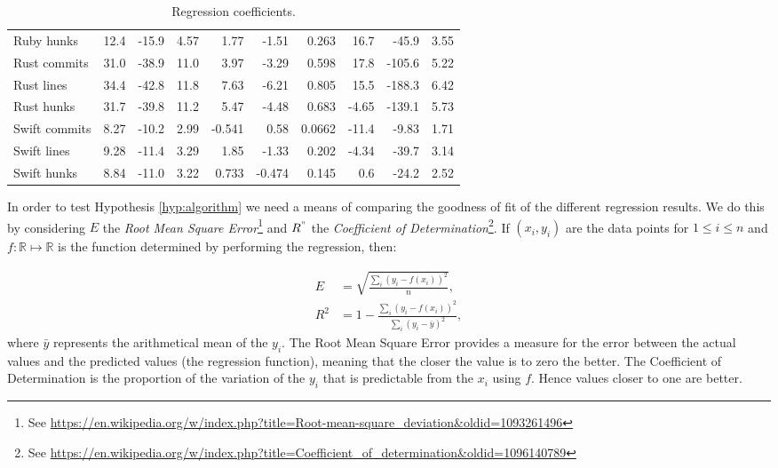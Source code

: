 \documentclass[10pt,journal,compsoc]{IEEEtran}
\begin{document}
\begin{table*}[t!]
\begin{center}
\begin{tabular}{l | *{3}{d{3.4}} | *{3}{d{3.4}} | d{4.5} *{2}{d{3.4}} }
Ruby hunks & 12.4 & -15.9 & 4.57 & 1.77 & -1.51 & 0.263 & 16.7 & -45.9 & 3.55 \\ \hdashline
Rust commits & 31.0 & -38.9 & 11.0 & 3.97 & -3.29 & 0.598 & 17.8 & -105.6 & 5.22 \\
Rust lines & 34.4 & -42.8 & 11.8 & 7.63 & -6.21 & 0.805 & 15.5 & -188.3 & 6.42 \\
Rust hunks & 31.7 & -39.8 & 11.2 & 5.47 & -4.48 & 0.683 & -4.65 & -139.1 & 5.73 \\ \hdashline
Swift commits & 8.27 & -10.2 & 2.99 & -0.541 & 0.58 & 0.0662 & -11.4 & -9.83 & 1.71 \\
Swift lines & 9.28 & -11.4 & 3.29 & 1.85 & -1.33 & 0.202 & -4.34 & -39.7 & 3.14 \\
Swift hunks & 8.84 & -11.0 & 3.22 & 0.733 & -0.474 & 0.145 & 0.6 & -24.2 & 2.52
\end{tabular}
\caption{\label{table:coefficients}Regression coefficients.}
\end{center}
\end{table*}

In order to test Hypothesis \ref{hyp:algorithm} we need a means of comparing the goodness of fit of the different regression results. We do this by considering $E$ the {\it Root Mean Square Error\/}\footnote{See \url{https://en.wikipedia.org/w/index.php?title=Root-mean-square_deviation&oldid=1093261496}} and $R^"$ the {\it Coefficient of Determination\/}\footnote{See \url{https://en.wikipedia.org/w/index.php?title=Coefficient_of_determination&oldid=1096140789}}. If $(x_i, y_i)$ are the data points for $1 \le i \le n$ and $f : \mathbb{R} \mapsto \mathbb{R}$ is the function determined by performing the regression, then:

\begin{align}
E   & = \sqrt{\frac{\sum_i (y_i - f(x_i))^2}{n}}, \\
R^2 & = 1 - \frac{\sum_i (y_i - f(x_i))^2}{\sum_i (y_i - \bar{y})^2},
\end{align}
where $\bar{y}$ represents the arithmetical mean of the $y_i$. The Root Mean Square Error provides a measure for the error between the actual values and the predicted values (the regression function), meaning that the closer the value is to zero the better. The Coefficient of Determination is the proportion of the variation of the $y_i$ that is predictable from the $x_i$ using $f$. Hence values closer to one are better.
\end{document}
